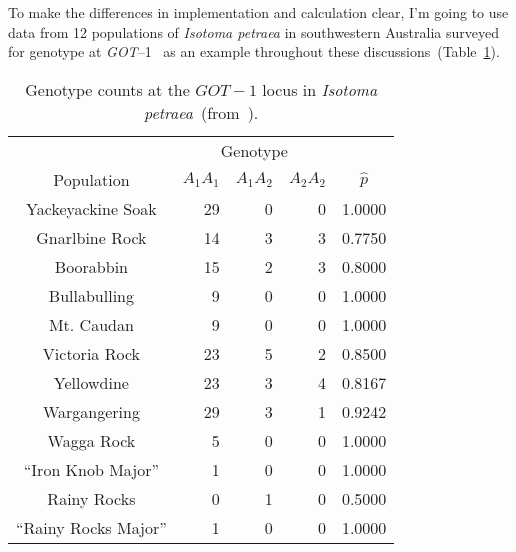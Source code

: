 To make the differences in implementation and calculation clear, I'm
going to use data from 12 populations of {\it Isotoma petraea\/} in
southwestern Australia surveyed for genotype at {\it
  GOT\/}--1~\cite{James-etal-1983} as an example throughout these
discussions~(Table~\ref{table:isotoma}).
\begin{table}
\begin{center}
\begin{tabular}{c|rrr|c}
\hline\hline
           & \multicolumn{3}{c|}{Genotype} & \\
Population & $A_{1}A_{1}$ & $A_{1}A_{2}$ & $A_{2}A_{2}$ & $\hat p$ \\
\hline
Yackeyackine Soak     & 29 & 0 & 0 & 1.0000 \\
Gnarlbine Rock        & 14 & 3 & 3 & 0.7750 \\
Boorabbin             & 15 & 2 & 3 & 0.8000 \\
Bullabulling          & 9  & 0 & 0 & 1.0000 \\
Mt. Caudan            & 9  & 0 & 0 & 1.0000 \\
Victoria Rock         & 23 & 5 & 2 & 0.8500 \\
Yellowdine            & 23 & 3 & 4 & 0.8167 \\
Wargangering          & 29 & 3 & 1 & 0.9242 \\
Wagga Rock            & 5  & 0 & 0 & 1.0000 \\
``Iron Knob Major''   & 1  & 0 & 0 & 1.0000 \\
Rainy Rocks           & 0  & 1 & 0 & 0.5000 \\
``Rainy Rocks Major'' & 1  & 0 & 0 & 1.0000 \\
\hline
\end{tabular}
\end{center}
\caption{Genotype counts at the $GOT-1$ locus in {\it Isotoma
    petraea}~(from~\cite{James-etal-1983}).}\label{table:isotoma}
\end{table}

